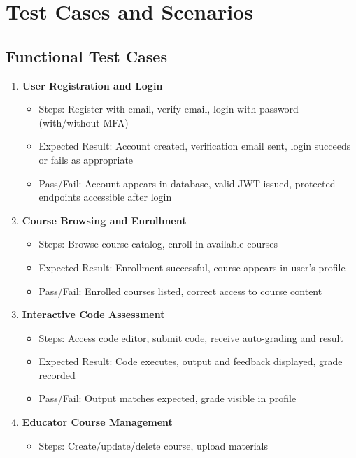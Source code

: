 \documentclass[a4paper,11pt]{scrartcl}
\begin{document}
\section{Test Cases and Scenarios}

\subsection{Functional Test Cases}
\begin{enumerate}[leftmargin=*]
    \item \textbf{User Registration and Login}
        \begin{itemize}
            \item Steps: Register with email, verify email, login with password (with/without MFA)
            \item Expected Result: Account created, verification email sent, login succeeds or fails as appropriate
            \item Pass/Fail: Account appears in database, valid JWT issued, protected endpoints accessible after login
        \end{itemize}
    \item \textbf{Course Browsing and Enrollment}
        \begin{itemize}
            \item Steps: Browse course catalog, enroll in available courses
            \item Expected Result: Enrollment successful, course appears in user’s profile
            \item Pass/Fail: Enrolled courses listed, correct access to course content
        \end{itemize}
    \item \textbf{Interactive Code Assessment}
        \begin{itemize}
            \item Steps: Access code editor, submit code, receive auto-grading and result
            \item Expected Result: Code executes, output and feedback displayed, grade recorded
            \item Pass/Fail: Output matches expected, grade visible in profile
        \end{itemize}
    \item \textbf{Educator Course Management}
        \begin{itemize}
            \item Steps: Create/update/delete course, upload materials

\end{itemize}
\end{enumerate}
\end{document}

